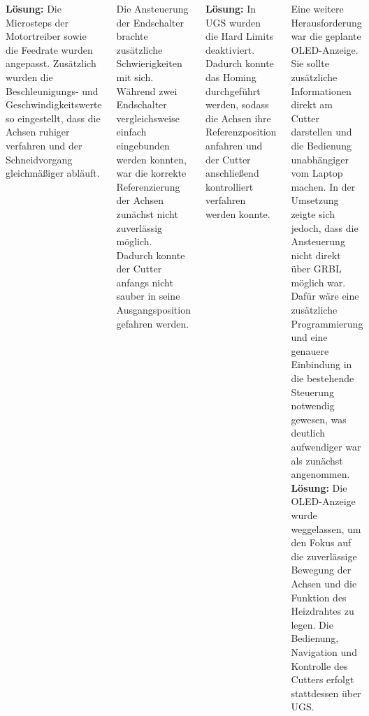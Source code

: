\documentclass[25pt,a0paper, portrait]{tikzposter}
\begin{document}
\begin{columns}
{{			\textbf{Lösung:} Die Microsteps der Motortreiber sowie die Feedrate wurden angepasst. Zusätzlich wurden die Beschleunigungs- und Geschwindigkeitswerte so eingestellt, dass die Achsen ruhiger verfahren und der Schneidvorgang gleichmäßiger abläuft.
		}
			
			{
				Die Ansteuerung der Endschalter brachte zusätzliche Schwierigkeiten mit sich. Während zwei Endschalter vergleichsweise einfach eingebunden werden konnten, war die korrekte Referenzierung der Achsen zunächst nicht zuverlässig möglich. Dadurch konnte der Cutter anfangs nicht sauber in seine Ausgangsposition gefahren werden.
				
				\textbf{Lösung:} In UGS wurden die Hard Limits deaktiviert. Dadurch konnte das Homing durchgeführt werden, sodass die Achsen ihre Referenzposition anfahren und der Cutter anschließend kontrolliert verfahren werden konnte.
			}
			
			 { Eine weitere Herausforderung war die geplante OLED-Anzeige. Sie sollte zusätzliche Informationen direkt am Cutter darstellen und die Bedienung unabhängiger vom Laptop machen. In der Umsetzung zeigte sich jedoch, dass die Ansteuerung nicht direkt über GRBL möglich war. Dafür wäre eine zusätzliche Programmierung und eine genauere Einbindung in die bestehende Steuerung notwendig gewesen, was deutlich aufwendiger war als zunächst angenommen. \textbf{Lösung:} Die OLED-Anzeige wurde weggelassen, um den Fokus auf die zuverlässige Bewegung der Achsen und die Funktion des Heizdrahtes zu legen. Die Bedienung, Navigation und Kontrolle des Cutters erfolgt stattdessen über UGS. }
		}
		
	\end{columns}
	
\end{document}
